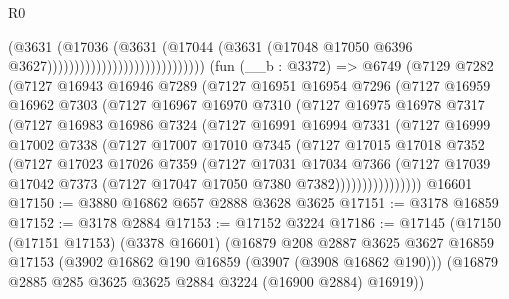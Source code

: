 \begin{lexlean}{R0}
\begin{coremodule}
                                                  (@3631
                                                    (@17036
                                                      (@3631
                                                        (@17044
                                                          (@3631
                                                            (@17048
                                                              @17050
                                                              @6396
                                                              @3627)))))))))))))))))))))))))))))
    (fun (__b : @3372) =>
    @6749
      (@7129
        @7282
        (@7127
          @16943
          @16946
          @7289
          (@7127
            @16951
            @16954
            @7296
            (@7127
              @16959
              @16962
              @7303
              (@7127
                @16967
                @16970
                @7310
                (@7127
                  @16975
                  @16978
                  @7317
                  (@7127
                    @16983
                    @16986
                    @7324
                    (@7127
                      @16991
                      @16994
                      @7331
                      (@7127
                        @16999
                        @17002
                        @7338
                        (@7127
                          @17007
                          @17010
                          @7345
                          (@7127
                            @17015
                            @17018
                            @7352
                            (@7127
                              @17023
                              @17026
                              @7359
                              (@7127
                                @17031
                                @17034
                                @7366
                                (@7127
                                  @17039
                                  @17042
                                  @7373
                                  (@7127 @17047 @17050 @7380 @7382))))))))))))))))
    @16601
@17150 := @3880 @16862 @657 @2888 @3628 @3625
@17151 := @3178 @16859
@17152 := @3178 @2884
@17153 := @17152 @3224
@17186 := @17145
    (@17150
      (@17151 @17153)
      (@3378 @16601)
      (@16879
        @208
        @2887
        @3625
        @3627
        @16859
        @17153
        (@3902 @16862 @190 @16859 (@3907 (@3908 @16862 @190)))
        (@16879 @2885 @285 @3625 @3625 @2884 @3224 (@16900 @2884) @16919))

\end{coremodule}
\end{lexlean}
